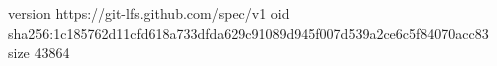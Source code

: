 version https://git-lfs.github.com/spec/v1
oid sha256:1c185762d11cfd618a733dfda629c91089d945f007d539a2ce6c5f84070acc83
size 43864
